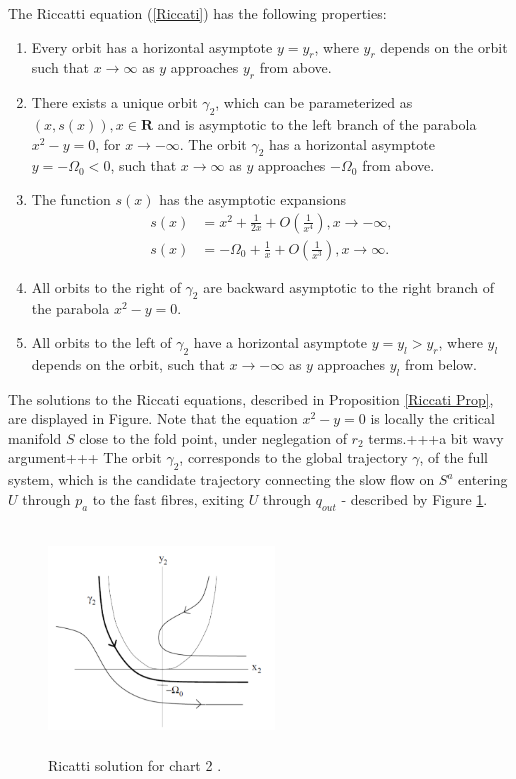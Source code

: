 \begin{prop}\label{Riccati Prop} 
The Riccatti equation (\ref{Riccati}) has the following properties:
\begin{enumerate}
\item Every orbit has a horizontal asymptote $y=y_r$, where $y_r$ depends on the orbit such that $x \to \infty$ as $y$ approaches $y_r$ from above.
\item There exists a unique orbit $\gamma_2$, which can be parameterized as $(x,s(x)), x \in \mathbf{R}$ and is asymptotic to the left branch of the parabola $x^2 - y = 0$, for $x \to - \infty$. The orbit $\gamma_2$ has a horizontal asymptote $y= - \Omega_0 <0$, such that $x \to \infty$ as $y$ approaches $-\Omega_0$ from above.
\item The function $s(x)$ has the asymptotic expansions
\begin{align*}
s(x) &= x^2 + \frac{1}{2x} + O\left( \frac{1}{x^4} \right), x \to -\infty,\\
s(x) &= -\Omega_0 + \frac{1}{x} + O\left( \frac{1}{x^3} \right), x \to \infty.
\end{align*}
\item All orbits to the right of $\gamma_2$  are backward asymptotic to the right branch of the parabola $x^2-y=0$.
\item All orbits to the left of $\gamma_2$ have a horizontal asymptote $y=y_l>y_r$, where $y_l$ depends on the orbit, such that $x \to -\infty$ as $y$ approaches $y_l$ from below.
\end{enumerate}
\end{prop}

The solutions to the Riccati equations, described in Proposition \ref{Riccati Prop}, are displayed in Figure. Note that the equation $x^2 - y=0$ is locally the critical manifold $S$ close to the fold point, under neglegation of $r_2$ terms.+++a bit wavy argument+++
The orbit $\gamma_2$, corresponds to the global trajectory $\gamma$, of the full system, which is the candidate trajectory connecting the slow flow on $S^a$ entering $U$ through $p_a$ to the fast fibres, exiting $U$ through $q_{out}$ - described by Figure \ref{fig: Ricatti Sol}. 
\begin{figure}[h!]\centering
	\includegraphics[height=6cm,width=6cm]{Images/Dynamics_in_K2}
	\caption{Ricatti solution for chart 2 \citep{krupa2001}.}
	\label{fig: Ricatti Sol}
\end{figure}\newpage
 

